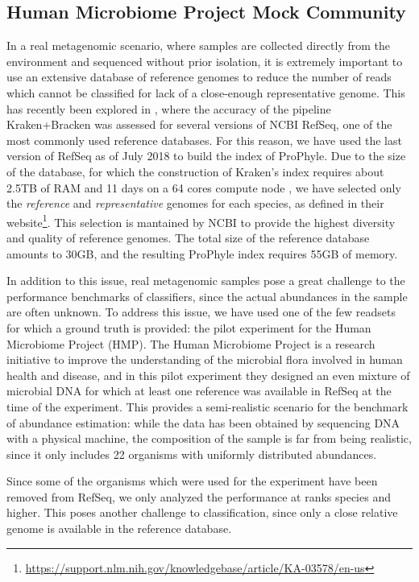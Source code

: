 \subsection{Human Microbiome Project Mock Community}
\label{hmp_exp}

In a real metagenomic scenario, where samples are collected directly from the environment and sequenced without prior isolation, it is extremely important to use an extensive database of reference genomes to reduce the number of reads which cannot be classified for lack of a close-enough representative genome. This has recently been explored in \cite{nasko_refseq_2018}, where the accuracy of the pipeline Kraken+Bracken was assessed for several versions of NCBI RefSeq, one of the most commonly used reference databases. For this reason, we have used the last version of RefSeq as of July 2018 to build the index of ProPhyle. Due to the size of the database, for which the construction of Kraken's index requires about 2.5TB of RAM and 11 days on a 64 cores compute node \cite{nasko_refseq_2018}, we have selected only the \textit{reference} and \textit{representative} genomes for each species, as defined in their website\footnote{\url{https://support.nlm.nih.gov/knowledgebase/article/KA-03578/en-us}}. This selection is mantained by NCBI to provide the highest diversity and quality of reference genomes. The total size of the reference database amounts to 30GB, and the resulting ProPhyle index requires 55GB of memory.

In addition to this issue, real metagenomic samples pose a great challenge to the performance benchmarks of classifiers, since the actual abundances in the sample are often unknown. To address this issue, we have used one of the few readsets for which a ground truth is provided: the pilot experiment for the Human Microbiome Project (HMP). The Human Microbiome Project is a research initiative to improve the understanding of the microbial flora involved in human health and disease, and in this pilot experiment they designed an even mixture of microbial DNA for which at least one reference was available in RefSeq at the time of the experiment. This provides a semi-realistic scenario for the benchmark of abundance estimation: while the data has been obtained by sequencing DNA with a physical machine, the composition of the sample is far from being realistic, since it only includes 22 organisms with uniformly distributed abundances.

Since some of the organisms which were used for the experiment have been removed from RefSeq, we only analyzed the performance at ranks species and higher. This poses another challenge to classification, since only a close relative genome is available in the reference database.

